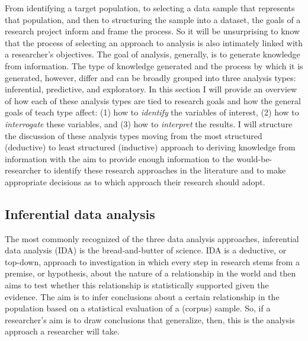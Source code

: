 \documentclass[
  letterpaper,
]{scrbook}
\begin{document}
From identifying a target population, to selecting a data sample that
represents that population, and then to structuring the sample into a
dataset, the goals of a research project inform and frame the process.
So it will be unsurprising to know that the process of selecting an
approach to analysis is also intimately linked with a researcher's
objectives. The goal of analysis, generally, is to generate knowledge
from information. The type of knowledge generated and the process by
which it is generated, however, differ and can be broadly grouped into
three analysis types: inferential, predictive, and exploratory. In this
section I will provide an overview of how each of these analysis types
are tied to research goals and how the general goals of teach type
affect: (1) how to \emph{identify} the variables of interest, (2) how to
\emph{interrogate} these variables, and (3) how to \emph{interpret} the
results. I will structure the discussion of these analysis types moving
from the most structured (deductive) to least structured (inductive)
approach to deriving knowledge from information with the aim to provide
enough information to the would-be-researcher to identify these research
approaches in the literature and to make appropriate decisions as to
which approach their research should adopt.

\hypertarget{inferential-data-analysis}{%
\subsection{Inferential data analysis}\label{inferential-data-analysis}}

The most commonly recognized of the three data analysis approaches,
inferential data analysis (IDA) is the bread-and-butter of science. IDA
is a deductive, or top-down, approach to investigation in which every
step in research stems from a premise, or hypothesis, about the nature
of a relationship in the world and then aims to test whether this
relationship is statistically supported given the evidence. The aim is
to infer conclusions about a certain relationship in the population
based on a statistical evaluation of a (corpus) sample. So, if a
researcher's aim is to draw conclusions that generalize, then, this is
the analysis approach a researcher will take.
\end{document}
